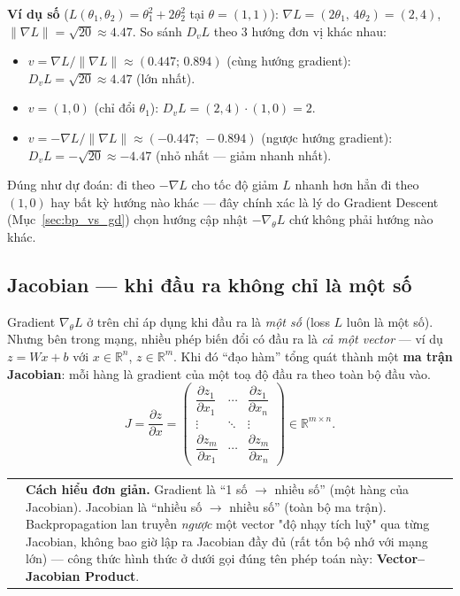 \documentclass[12pt,a4paper]{report}
\makeatletter
\newenvironment{tructiep}[1][Cách hiểu đơn giản]
  {\par\smallskip\noindent\begin{tabular}{@{}p{0.35em}@{\hspace{6pt}}p{\dimexpr\linewidth-1.9em\relax}@{}}
   \textcolor{boxln}{\rule{2pt}{\baselineskip}} & \textbf{#1.}\enspace\ignorespaces}
  {\end{tabular}\par\smallskip}
\makeatother
\begin{document}
\textbf{Ví dụ số} ($L(\theta_1,\theta_2)=\theta_1^2+2\theta_2^2$ tại
$\theta=(1,1)$): $\nabla L = (2\theta_1,\,4\theta_2) = (2,4)$,
$\lVert\nabla L\rVert=\sqrt{20}\approx4.47$. So sánh $D_vL$ theo 3 hướng
đơn vị khác nhau:
\begin{itemize}
\item $v=\nabla L/\lVert\nabla L\rVert\approx(0.447;\,0.894)$ (cùng hướng gradient): $D_vL=\sqrt{20}\approx4.47$ (lớn nhất).
\item $v=(1,0)$ (chỉ đổi $\theta_1$): $D_vL = (2,4)\cdot(1,0)=2$.
\item $v=-\nabla L/\lVert\nabla L\rVert\approx(-0.447;\,-0.894)$ (ngược hướng gradient): $D_vL=-\sqrt{20}\approx-4.47$ (nhỏ nhất --- giảm nhanh nhất).
\end{itemize}
Đúng như dự đoán: đi theo $-\nabla L$ cho tốc độ giảm $L$ nhanh hơn hẳn đi
theo $(1,0)$ hay bất kỳ hướng nào khác --- đây chính xác là lý do
Gradient Descent (Mục~\ref{sec:bp_vs_gd}) chọn hướng cập nhật
$-\nabla_\theta L$ chứ không phải hướng nào khác.

\subsection{Jacobian --- khi đầu ra không chỉ là một số}
\label{sec:jacobian}

Gradient $\nabla_\theta L$ ở trên chỉ áp dụng khi đầu ra là \emph{một số}
(loss $L$ luôn là một số). Nhưng bên trong mạng, nhiều phép biến đổi có
đầu ra là \emph{cả một vector} --- ví dụ $z=Wx+b$ với $x\in\mathbb R^n$,
$z\in\mathbb R^m$. Khi đó ``đạo hàm'' tổng quát thành một \textbf{ma trận
Jacobian}: mỗi hàng là gradient của một toạ độ đầu ra theo toàn bộ đầu vào.
$$J = \frac{\partial z}{\partial x} = \begin{pmatrix}
\dfrac{\partial z_1}{\partial x_1} & \cdots & \dfrac{\partial z_1}{\partial x_n} \\[4pt]
\vdots & \ddots & \vdots \\[2pt]
\dfrac{\partial z_m}{\partial x_1} & \cdots & \dfrac{\partial z_m}{\partial x_n}
\end{pmatrix} \in \mathbb R^{m\times n}.$$

\begin{tructiep}
Gradient là ``1 số $\to$ nhiều số'' (một hàng của Jacobian). Jacobian là
``nhiều số $\to$ nhiều số'' (toàn bộ ma trận). Backpropagation lan truyền
\emph{ngược} một vector "độ nhạy tích luỹ" qua từng Jacobian, không bao giờ
lập ra Jacobian đầy đủ (rất tốn bộ nhớ với mạng lớn) --- công thức hình
thức ở dưới gọi đúng tên phép toán này: \textbf{Vector--Jacobian Product}.
\end{tructiep}
\end{document}
